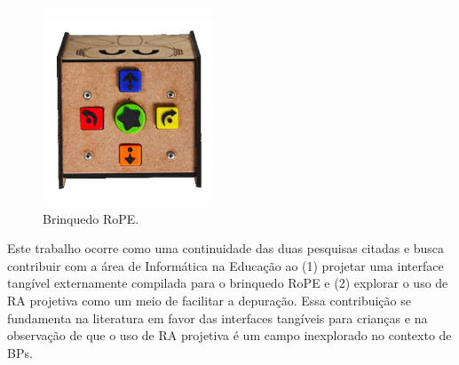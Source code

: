 \begin{figure}[!htbp]
    \centering
    \includegraphics[width=.3\linewidth,fbox]{figs/rope_top.png}
    \caption{Brinquedo RoPE.}
    \label{fig_rope}
\end{figure}


Este trabalho ocorre como uma continuidade das duas pesquisas citadas e busca contribuir com a área de Informática na Educação ao (1) projetar uma interface tangível externamente compilada para o brinquedo RoPE e (2) explorar o uso de RA projetiva como um meio de facilitar a depuração. Essa contribuição se fundamenta na literatura em favor das interfaces tangíveis para crianças \cite{sapounidis_evaluating_2015, fincher_tangible_2019, plowman_interactivity_2004} e na observação de que o uso de RA projetiva é um campo inexplorado no contexto de BPs.


